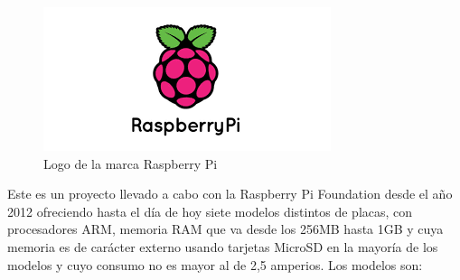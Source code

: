 \begin{figure}[htb]
\centering
\includegraphics[scale=0.7]{./Figuras/raspi_logo.png}
\caption{Logo de la marca Raspberry Pi}
\label{fig:raspi_logo}
\vspace*{-10pt}
\end{figure}

Este es un proyecto llevado a cabo con la Raspberry Pi Foundation\cite{RaspberryPi} desde el año 2012 ofreciendo hasta el día de hoy siete modelos distintos de placas, con procesadores ARM, memoria RAM que va desde los 256MB hasta 1GB y cuya memoria es de carácter externo usando tarjetas MicroSD en la mayoría de los modelos y cuyo consumo no es mayor al de 2,5 amperios. Los modelos son:
